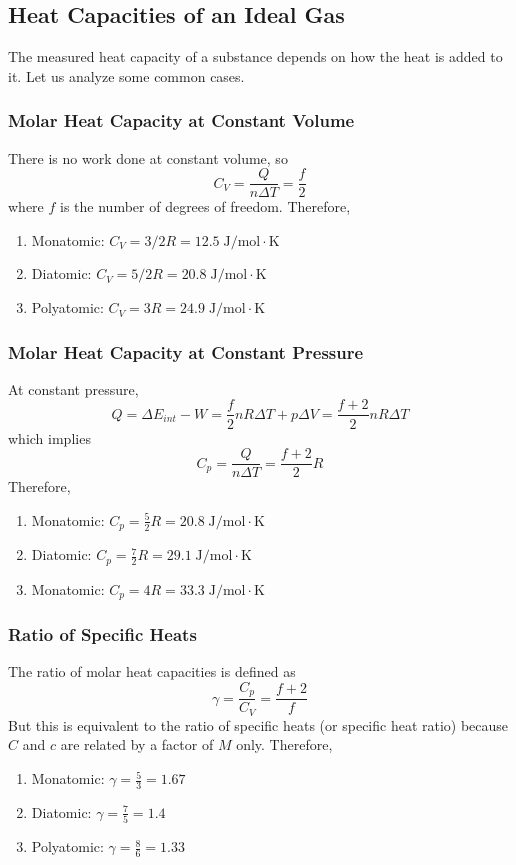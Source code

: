 \documentclass[../PhysicsFormulae.tex]{subfiles}
\begin{document}
\subsection{Heat Capacities of an Ideal Gas}
The measured heat capacity of a substance depends on how the heat is added to it. Let us analyze some common cases.

\subsubsection{Molar Heat Capacity at Constant Volume}
There is no work done at constant volume, so
\[ C_V = \frac{Q}{n \Delta T} = \frac{f}{2} \]
where $f$ is the number of degrees of freedom. Therefore, 
\begin{enumerate}
    \item Monatomic: $C_V = 3/2 R = 12.5 \; \mathrm{J/mol \cdot K}$
    \item Diatomic: $C_V = 5/2 R = 20.8 \; \mathrm{J/mol \cdot K}$
    \item Polyatomic: $C_V = 3 R = 24.9 \; \mathrm{J/mol \cdot K}$ 
\end{enumerate}

\subsubsection{Molar Heat Capacity at Constant Pressure}
At constant pressure, 
\[ Q = \Delta E_{int} - W = \frac{f}{2}nR\Delta T + p\Delta V = \frac{f + 2}{2}nR\Delta T \]
which implies
\[ C_p = \frac{Q}{n \Delta T} = \frac{f + 2}{2} R \]
Therefore, 
\begin{enumerate}
    \item Monatomic: $C_p = \frac{5}{2}R = 20.8 \; \mathrm{J/mol \cdot K}$
    \item Diatomic: $C_p = \frac{7}{2}R = 29.1 \; \mathrm{J/mol \cdot K}$
    \item Monatomic: $C_p = 4R = 33.3 \; \mathrm{J/mol \cdot K}$
\end{enumerate}

\subsubsection{Ratio of Specific Heats}
The ratio of molar heat capacities is defined as 
\[ \gamma = \frac{C_p}{C_V} = \frac{f + 2}{f} \]
But this is equivalent to the ratio of specific heats (or specific heat ratio) because $C$ and $c$ are related by a factor of $M$ only. Therefore, 
\begin{enumerate}
    \item Monatomic: $\gamma = \frac{5}{3} = 1.67$
    \item Diatomic: $\gamma = \frac{7}{5} = 1.4$
    \item Polyatomic: $\gamma = \frac{8}{6} = 1.33$
\end{enumerate}
\end{document}
